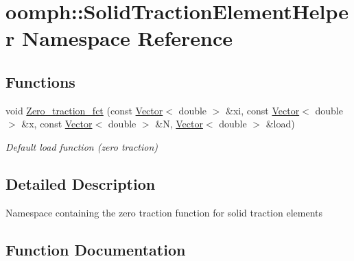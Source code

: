 \hypertarget{namespaceoomph_1_1SolidTractionElementHelper}{}\section{oomph\+:\+:Solid\+Traction\+Element\+Helper Namespace Reference}
\label{namespaceoomph_1_1SolidTractionElementHelper}
\subsection*{Functions}
\begin{DoxyCompactItemize}
\item 
void \hyperlink{namespaceoomph_1_1SolidTractionElementHelper_a6b68500cbfa68e9f452e989b803ee4cd}{Zero\+\_\+traction\+\_\+fct} (const \hyperlink{classoomph_1_1Vector}{Vector}$<$ double $>$ \&xi, const \hyperlink{classoomph_1_1Vector}{Vector}$<$ double $>$ \&x, const \hyperlink{classoomph_1_1Vector}{Vector}$<$ double $>$ \&N, \hyperlink{classoomph_1_1Vector}{Vector}$<$ double $>$ \&load)
\begin{DoxyCompactList}\small\item\em Default load function (zero traction) \end{DoxyCompactList}\end{DoxyCompactItemize}


\subsection{Detailed Description}
Namespace containing the zero traction function for solid traction elements 

\subsection{Function Documentation}
\mbox{\label{namespaceoomph_1_1SolidTractionElementHelper_a6b68500cbfa68e9f452e989b803ee4cd}} 

